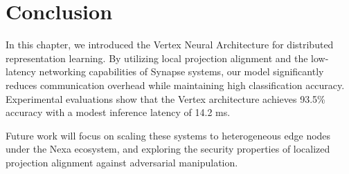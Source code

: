 \section{Conclusion}
\label{sec:conclusion}

In this chapter, we introduced the Vertex Neural Architecture for distributed representation learning. By utilizing local projection alignment and the low-latency networking capabilities of Synapse systems, our model significantly reduces communication overhead while maintaining high classification accuracy. Experimental evaluations show that the Vertex architecture achieves 93.5\% accuracy with a modest inference latency of 14.2 ms.

Future work will focus on scaling these systems to heterogeneous edge nodes under the Nexa ecosystem, and exploring the security properties of localized projection alignment against adversarial manipulation.

